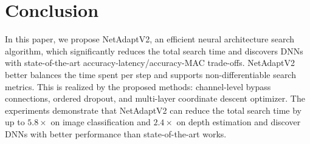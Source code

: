 \section{Conclusion}

In this paper, we propose NetAdaptV2, an efficient neural architecture search algorithm, which significantly reduces the total search time and discovers DNNs with state-of-the-art accuracy-latency/accuracy-MAC trade-offs. 
NetAdaptV2 better balances the time spent per step and supports non-differentiable search metrics. This is realized by the proposed methods: channel-level bypass connections, ordered dropout, and multi-layer coordinate descent optimizer. The experiments demonstrate that NetAdaptV2 can reduce the total search time by up to $5.8\times$ on image classification and $2.4\times$ on depth estimation and discover DNNs with better performance than state-of-the-art works.
